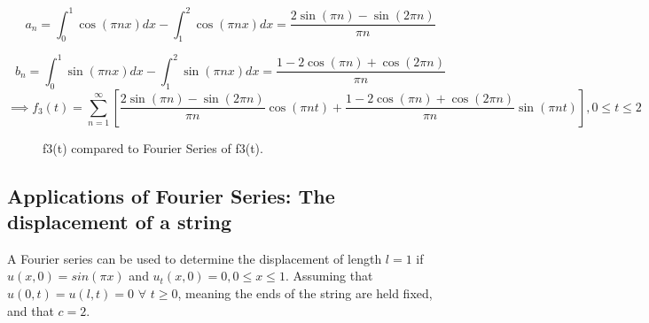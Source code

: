\documentclass{article}
\begin{document}
\begin{equation*}
	a_{n}= \int_{0}^{1}\cos(\pi nx) dx -\int_{1}^{2}\cos(\pi nx) dx= \frac{2\sin(\pi n)-\sin(2\pi n)}{\pi n}
\end{equation*}

\begin{equation*}
	b_{n}=\int_{0}^{1} \sin(\pi nx) dx -\int_{1}^{2} \sin(\pi nx) dx= \frac{1-2\cos(\pi n)+\cos(2\pi n)}{\pi n}
\end{equation*}
\begin{equation*}
	\implies  f_3(t)=\sum_{n=1}^{\infty} [ \frac{2\sin(\pi n)-\sin(2\pi n)}{\pi n}\cos(\pi nt)+\frac{1-2\cos(\pi n)+\cos(2\pi n)}{\pi n} \sin(\pi nt)], 0 \leq t \leq 2
\end{equation*}
\begin{figure}
    \centering
    \qquad
    \caption{f3(t) compared to Fourier Series of f3(t).}
    \label{fig:f3-a}
\end{figure}

\subsection{Applications of Fourier Series: The displacement of a string}
A Fourier series can be used to determine the displacement of length $l=1$ if $u(x,0)=sin(\pi x)$ and $u_t(x,0)=0, 0 \leq x \leq 1$. Assuming that $u(0,t)=u(l,t)=0$  $\forall$  $t \ge 0$, meaning the ends of the string are held fixed, and that $c=2$.
\end{document}
